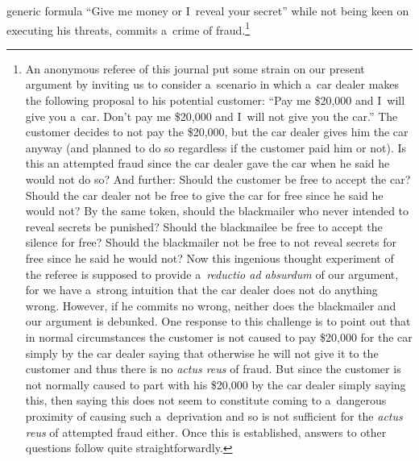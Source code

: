  generic formula ``Give me money or I~reveal your secret'' while not being keen on executing his threats, commits a~crime of fraud.\footnote{An anonymous referee of this journal put some strain on our present argument by inviting us to consider a~scenario in which a~car dealer makes the following proposal to his potential customer: ``Pay me \$20,000 and I~will give you a~car. Don't pay me \$20,000 and I~will not give you the car.'' The customer decides to not pay the \$20,000, but the car dealer gives him the car anyway (and planned to do so regardless if the customer paid him or not). Is this an attempted fraud since the car dealer gave the car when he said he would not do so? And further: Should the customer be free to accept the car? Should the car dealer not be free to give the car for free since he said he would not? By the same token, should the blackmailer who never intended to reveal secrets be punished? Should the blackmailee be free to accept the silence for free? Should the blackmailer not be free to not reveal secrets for free since he said he would not? Now this ingenious thought experiment of the referee is supposed to provide a~\textit{reductio ad absurdum} of our argument, for we have a~strong intuition that the car dealer does not do anything wrong. However, if he commits no wrong, neither does the blackmailer and our argument is debunked. One response to this challenge is to point out that in normal circumstances the customer is not caused to pay \$20,000 for the car simply by the car dealer saying that otherwise he will not give it to the customer and thus there is no \textit{actus reus} of fraud. But since the customer is not normally caused to part with his \$20,000 by the car dealer simply saying this, then saying this does not seem to constitute coming to a~dangerous proximity of causing such a~deprivation and so is not sufficient for the \textit{actus reus} of attempted fraud either. Once this is established, answers to other questions follow quite straightforwardly.



}
